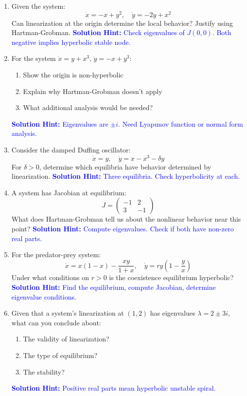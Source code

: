\documentclass[12pt]{article}
\newcommand{\solution}[1]{\textcolor{blue}{\textbf{Solution Hint:} #1}}
\begin{document}
\begin{enumerate}[resume]
\item Given the system:
$$\dot{x} = -x + y^2, \quad \dot{y} = -2y + x^2$$
Can linearization at the origin determine the local behavior? Justify using Hartman-Grobman.
\solution{Check eigenvalues of $J(0,0)$. Both negative implies hyperbolic stable node.}

\item For the system $\dot{x} = y + x^3$, $\dot{y} = -x + y^3$:
\begin{enumerate}[label=(\alph*)]
    \item Show the origin is non-hyperbolic
    \item Explain why Hartman-Grobman doesn't apply
    \item What additional analysis would be needed?
\end{enumerate}
\solution{Eigenvalues are $\pm i$. Need Lyapunov function or normal form analysis.}

\item Consider the damped Duffing oscillator:
$$\dot{x} = y, \quad \dot{y} = x - x^3 - \delta y$$
For $\delta > 0$, determine which equilibria have behavior determined by linearization.
\solution{Three equilibria. Check hyperbolicity at each.}

\item A system has Jacobian at equilibrium:
$$J = \begin{pmatrix} -1 & 2 \\ 3 & -1 \end{pmatrix}$$
What does Hartman-Grobman tell us about the nonlinear behavior near this point?
\solution{Compute eigenvalues. Check if both have non-zero real parts.}

\item For the predator-prey system:
$$\dot{x} = x(1 - x) - \frac{xy}{1 + x}, \quad \dot{y} = ry\left(1 - \frac{y}{x}\right)$$
Under what conditions on $r > 0$ is the coexistence equilibrium hyperbolic?
\solution{Find the equilibrium, compute Jacobian, determine eigenvalue conditions.}

\item Given that a system's linearization at $(1,2)$ has eigenvalues $\lambda = 2 \pm 3i$, what can you conclude about:
\begin{enumerate}[label=(\alph*)]
    \item The validity of linearization?
    \item The type of equilibrium?
    \item The stability?
\end{enumerate}
\solution{Positive real parts mean hyperbolic unstable spiral.}
\end{enumerate}
\end{document}
